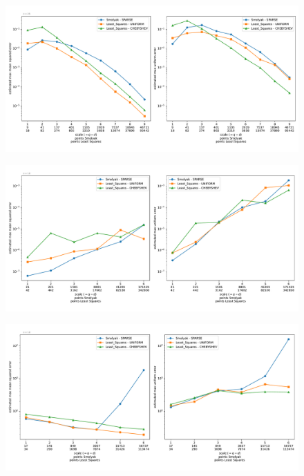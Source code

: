 \documentclass[12pt, oneside]{amsart}
\theoremstyle{definition}
\theoremstyle{remark}
\numberwithin{equation}{section}
\begin{document}
\begin{figure}[h]
	\centering
	\includegraphics[width=\linewidth]{figures/corner_peak/dim4/max_error_distribution_fixed_dim}
	\caption{}
	\label{fig:corner_peak_dim4}
\end{figure}

\begin{figure}[h]
	\centering
	\includegraphics[width=\linewidth]{figures/corner_peak/dim10/max_error_distribution_fixed_dim}
	\caption{}
	\label{fig:conrer_peak_dim10}
\end{figure}


\begin{figure}[h]
	\centering
	\includegraphics[width=\linewidth]{figures/discontinuous/dim8/max_error_distribution_fixed_dim}
	\caption{}
	\label{fig:discontinuous_dim8}
\end{figure}
\end{document}
